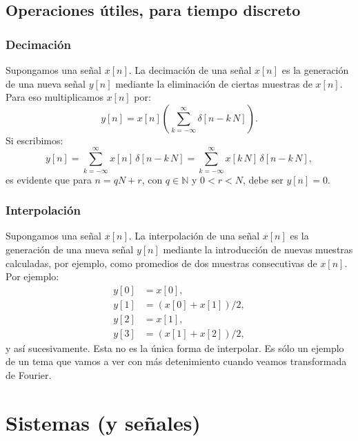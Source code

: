 \documentclass[11pt,a4paper,openany]{book}
\begin{document}
\section{Operaciones útiles, para tiempo discreto}


\subsection{Decimación}

Supongamos una señal $x[n]$. La decimación de una señal $x[n]$ es la generación de una nueva señal $y[n]$ mediante la eliminación de ciertas muestras de $x[n]$. Para eso multiplicamos $x[n]$ por:
\begin{equation}
	y[n] = x[n] \left( \sum_{k=-\infty}^{\infty} \delta[n - k \, N] \right).
\end{equation}
Si escribimos:
\begin{equation}
	y[n] = \sum_{k=-\infty}^{\infty} x[n] \, \delta[n - k \, N] =
	\sum_{k=-\infty}^{\infty} x[k \, N] \, \delta[n - k \, N],
\end{equation}
es evidente que para $n = qN + r$, con $q \in \mathbb{N}$ y $0 < r < N$, debe ser $y[n] = 0$.

\subsection{Interpolación}

Supongamos una señal $x[n]$. La interpolación de una señal $x[n]$ es la generación de una nueva señal $y[n]$ mediante la introducción de nuevas muestras 
calculadas, por ejemplo, como promedios de dos muestras consecutivas de $x[n]$. Por ejemplo:
\begin{align}
	y[0] &= x[0], \\
	y[1] &= (x[0] + x[1]) / 2, \\
	y[2] &= x[1], \\
	y[3] &= (x[1] + x[2]) / 2,
\end{align}
y así sucesivamente. Esta no es la única forma de interpolar. Es sólo un ejemplo de un tema que vamos a ver con más detenimiento cuando veamos transformada de Fourier.
	
	
	\chapter{Sistemas (y señales)}
	
	
\end{document}
